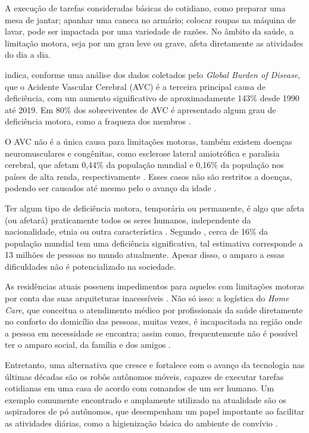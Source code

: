 A execução de tarefas consideradas básicas do cotidiano, como preparar uma mesa de jantar; apanhar uma caneca no armário; colocar roupas na máquina de lavar, pode ser impactada por uma variedade de razões. No âmbito da saúde, a limitação motora, seja por um grau leve ou grave, afeta diretamente as atividades do dia a dia. 

\citet{strokeStatistics:2022} indica, conforme uma análise dos dados coletados pelo\textit{ Global Burden of Disease}, que o Acidente Vascular Cerebral (AVC) é a terceira principal causa de deficiência, com um aumento significativo de aproximadamente 143\% desde 1990 até 2019. Em 80\% dos sobreviventes de  AVC é apresentado algum grau de deficiência motora, como a fraqueza dos membros \cite{postStroke:2019}. 

O AVC não é a única causa para limitações motoras, também existem doenças neuromusculares e congênitas, como esclerose lateral amiotrófica e paralisia cerebral, que afetam 0,44\% da população mundial  e 0,16\% da população nos países de alta renda,  respectivamente \cite{alsStatistics:2020,palsyStatistcs:2022}. Esses casos não são restritos a doenças, podendo ser causados até mesmo pelo o avanço da idade \cite{elderlyMobility:2019}. 

Ter algum tipo de deficiência motora, temporária ou permanente, é algo que afeta (ou afetará) praticamente todos os seres humanos, independente da nacionalidade, etnia ou outra característica  \cite{omsDisability:2023}. Segundo \citet{omsDisability:2023}, cerca de 16\% da população mundial tem uma deficiência significativa, tal estimativa corresponde a 13 milhões de pessoas no mundo atualmente. Apesar disso, o amparo a essas dificuldades não é potencializado na sociedade. 

As residências atuais possuem impedimentos para aqueles com limitações motoras por conta das suas arquiteturas inacessíveis \cite{whoHousing:2018}. Não só isso: a logística do \textit{Home Care}, que conceitua o atendimento médico por profissionais da saúde diretamente no conforto do domicílio das pessoas, muitas vezes, é incapacitada na região onde a pessoa em necessidade se encontra; assim como, frequentemente não é possível ter o amparo social, da família e dos amigos \cite{homeCare:2018}. 

Entretanto, uma alternativa que cresce e fortalece com o avanço da tecnologia nas últimas décadas são os robôs autônomos móveis, capazes de executar tarefas cotidianas em uma casa de acordo com comandos de um ser humano. Um exemplo comumente encontrado e amplamente utilizado na atualidade são os aspiradores de pó autônomos, que desempenham um papel importante ao facilitar as atividades diárias, como a higienização básica do ambiente de convívio \cite{roombaSite}. 

